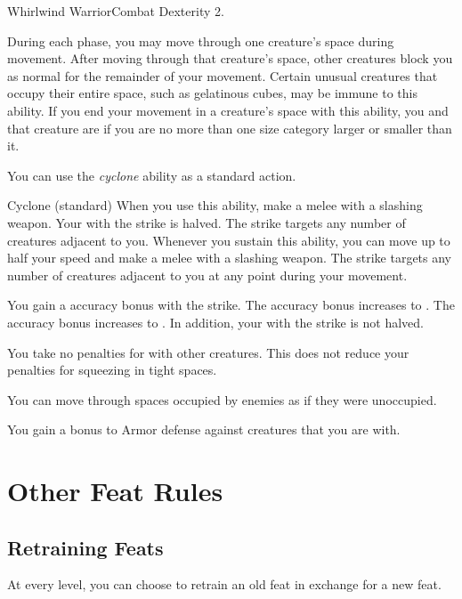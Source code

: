     \begin{feat}{Whirlwind Warrior}{Combat}
        \featpre Dexterity 2.

         During each phase, you may move through one creature's space during movement.
        After moving through that creature's space, other creatures block you as normal for the remainder of your movement.
        Certain unusual creatures that occupy their entire space, such as gelatinous cubes, may be immune to this ability.
        If you end your movement in a creature's space with this ability, you and that creature are \squeezing if you are no more than one size category larger or smaller than it.

         You can use the \textit{cyclone} ability as a standard action.
        \begin{sustainability}{Cyclone}{ (standard)}
            \rankline
            When you use this ability, make a melee  with a slashing weapon.
            Your  with the strike is halved.
            The strike targets any number of creatures adjacent to you.
            Whenever you sustain this ability, you can move up to half your speed and make a melee  with a slashing weapon.
            The strike targets any number of creatures adjacent to you at any point during your movement.

            \rankline
             You gain a  accuracy bonus with the strike.
             The accuracy bonus increases to .
             The accuracy bonus increases to .
            In addition, your  with the strike is not halved.
        \end{sustainability}

         You take no penalties for \squeezing with other creatures.
        This does not reduce your penalties for squeezing in tight spaces.

         You can move through spaces occupied by enemies as if they were unoccupied.

         You gain a  bonus to Armor defense against creatures that you are  with.
    \end{feat}

\section{Other Feat Rules}

    \subsection{Retraining Feats}
        At every level, you can choose to retrain an old feat in exchange for a new feat.
